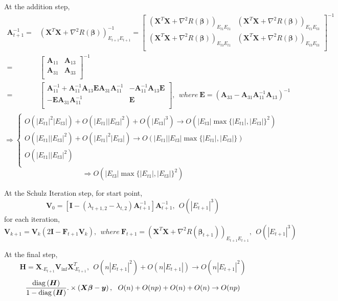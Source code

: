 \documentclass[letter]{article}
\begin{document}
	At the addition step,
	$$\begin{aligned}
	\bm{A}_{t+1}^{-1}
	=&\left(\bm{X}^T\bm{X}+\nabla^2R(\bm{\beta})\right)_{E_{t+1}E_{t+1}}^{-1}
	=\begin{bmatrix}
	\left(\bm{X}^T\bm{X}+\nabla^2R(\bm{\beta})\right)_{E_{t1}E_{t1}} & 
	\left(\bm{X}^T\bm{X}+\nabla^2R(\bm{\beta})\right)_{E_{t1}E_{t3}} \\
	\left(\bm{X}^T\bm{X}+\nabla^2R(\bm{\beta})\right)_{E_{t3}E_{t1}} & 
	\left(\bm{X}^T\bm{X}+\nabla^2R(\bm{\beta})\right)_{E_{t3}E_{t3}} \\
	\end{bmatrix}^{-1} \\
	=&\begin{bmatrix}
	\bm{A}_{11} & \bm{A}_{13} \\
	\bm{A}_{31} & \bm{A}_{33} \\
	\end{bmatrix}^{-1} \\
	=&\begin{bmatrix}
	\bm{A}_{11}^{-1}+\bm{A}_{11}^{-1}\bm{A}_{13}\bm{E}\bm{A}_{31}\bm{A}_{11}^{-1} & -\bm{A}_{11}^{-1}\bm{A}_{13}\bm{E} \\
	-\bm{E}\bm{A}_{31}\bm{A}_{11}^{-1} & \bm{E} \\
	\end{bmatrix},\ \ where\ 
	\bm{E}=\left(\bm{A}_{33}-\bm{A}_{31}\bm{A}_{11}^{-1}\bm{A}_{13}\right)^{-1}\\
	\end{aligned}$$
	$$\Rightarrow\begin{cases}
	O(|E_{t1}|^2|E_{t3}|)+O(|E_{t1}||E_{t3}|^2)+O(|E_{t3}|^3)\rightarrow O(|E_{t3}|\max\{|E_{t1}|,|E_{t3}|\}^2) \\
	O(|E_{t1}||E_{t3}|^2)+O(|E_{t1}|^2|E_{t3}|)\rightarrow O(|E_{t1}||E_{t3}|\max\{|E_{t1}|,|E_{t3}|\}) \\
	O(|E_{t1}||E_{t3}|^2) \\
	\end{cases} $$
	$$\Rightarrow O(|E_{t3}|\max\{|E_{t1}|,|E_{t3}|\}^2)$$
	
	At the Schulz Iteration step, for start point,
	$$\bm{V}_0=\left[\bm{I}-(\lambda_{t+1,2}-\lambda_{t,2})\bm{A}_{t+1}^{-1}\right]\bm{A}_{t+1}^{-1},\ \ O(|E_{t+1}|^3)$$
	for each iteration,
	$$\bm{V}_{k+1}=\bm{V}_{k}(2\bm{I}-\bm{F}_{t+1}\bm{V}_{k}),\ \ where\ \bm{F}_{t+1}=\left(\bm{X}^T\bm{X}+\nabla^2R(\bm{\beta}_{t+1})\right)_{E_{t+1}E_{t+1}},\ \ O(|E_{t+1}|^3)$$
	
	At the final step,
	$$\bm{H}=\bm{X}_{\cdot E_{t+1}}
	\bm{V}_{\inf}
	\bm{X}_{\cdot E_{t+1}}^T,\ \ O(n|E_{t+1}|^2)+O(n|E_{t+1}|)\rightarrow O\left(n|E_{t+1}|^2\right)$$
	$$\frac{{\rm diag}\left(\bm{H}\right)}{1-{\rm diag}\left(\bm{H}\right)}.\times\left(\bm{X}\bm{\beta}-\bm{y}\right),\ \ O(n)+O(np)+O(n)+O(n)\rightarrow O(np)$$
	\\
	
\end{document}
